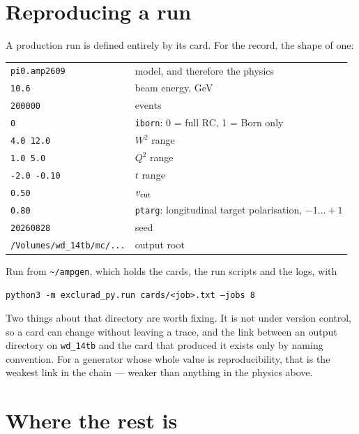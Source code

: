 \documentclass[11pt,a4paper]{article}
\newcommand{\code}[1]{\texttt{#1}}
\begin{document}
\section{Reproducing a run}

A production run is defined entirely by its card.  For the record, the shape of
one:

\begin{center}
\begin{tabular}{ll}
\toprule
\code{pi0.amp2609} & model, and therefore the physics\\
\code{10.6} & beam energy, GeV\\
\code{200000} & events\\
\code{0} & \code{iborn}: 0 = full RC, 1 = Born only\\
\code{4.0 12.0} & $W^2$ range\\
\code{1.0 5.0} & $Q^2$ range\\
\code{-2.0 -0.10} & $t$ range\\
\code{0.50} & $v_{\rm cut}$\\
\code{0.80} & \code{ptarg}: longitudinal target polarisation, $-1\ldots+1$\\
\code{20260828} & seed\\
\code{/Volumes/wd\_14tb/mc/...} & output root\\
\bottomrule
\end{tabular}
\end{center}

\noindent
Run from \code{\textasciitilde/ampgen}, which holds the cards, the run scripts
and the logs, with

\begin{center}
\code{python3 -m exclurad\_py.run cards/<job>.txt --jobs 8}
\end{center}

\noindent
Two things about that directory are worth fixing.  It is not under version
control, so a card can change without leaving a trace, and the link between an
output directory on \code{wd\_14tb} and the card that produced it exists only by
naming convention.  For a generator whose whole value is reproducibility, that is
the weakest link in the chain --- weaker than anything in the physics above.

\section*{Where the rest is}
\end{document}
